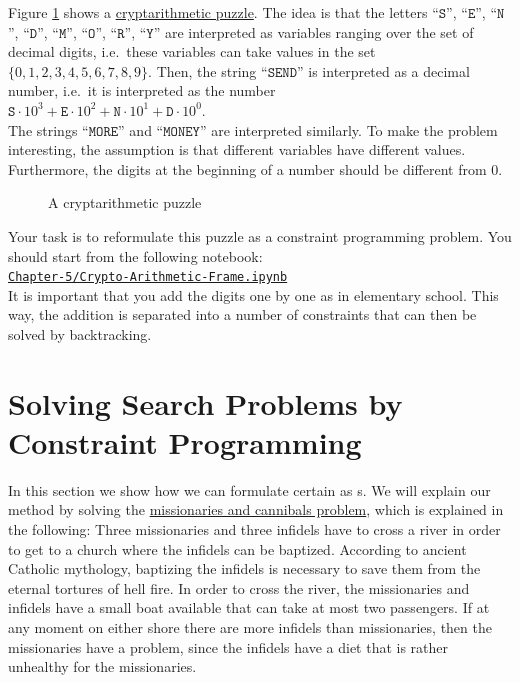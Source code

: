 \exerciseEng
Figure \ref{fig:send-more-money.pdf} shows a
\href{https://en.wikipedia.org/wiki/Verbal_arithmetic}{cryptarithmetic puzzle}.
The idea is that the letters 
``$\texttt{S}$'', ``$\texttt{E}$'', ``$\texttt{N}$'', ``$\texttt{D}$'', ``$\texttt{M}$'', ``$\texttt{O}$'', ``$\texttt{R}$'', ``$\texttt{Y}$'' 
are interpreted as variables ranging over the set of decimal digits, i.e.~these variables can take values in
the set $\{0,1,2,3,4,5,6,7,8,9\}$.  Then, the string ``$\texttt{SEND}$'' is interpreted as a decimal number,
i.e.~it is interpreted as the number
\\[0.2cm]
\hspace*{1.3cm}
$\texttt{S} \cdot 10^3 + \texttt{E} \cdot 10^2 + \texttt{N} \cdot 10^1 + \texttt{D} \cdot 10^0$.
\\[0.2cm]
The strings ``$\texttt{MORE}$'' and ``$\texttt{MONEY}$'' are interpreted similarly. To make the problem
interesting, the assumption is that different variables have different values.  Furthermore, the
digits at the beginning of a number should be different from $0$.


\begin{figure}[!ht]
\centering
{}

\caption{A cryptarithmetic puzzle}
\label{fig:send-more-money.pdf}
\end{figure}

Your task is to reformulate this puzzle as a constraint
programming problem.  You should start from the following notebook:
\\[0.2cm]
\hspace*{1.3cm}
\href{https://github.com/karlstroetmann/Logic/blob/master/TypeScript/Chapter-5/Crypto-Arithmetic-Frame.ipynb}{\texttt{Chapter-5/Crypto-Arithmetic-Frame.ipynb}}
\\[0.2cm]
It is important that you add the digits one by one as in elementary school.  This way, the addition is
separated into a number of constraints that can then be solved by backtracking.  \eox

\section{Solving Search Problems by Constraint Programming}
In this section we show how we can formulate certain  as s.
We will explain our method by solving the
\href{https://flashmuseum.org/priests-n-devils/}{missionaries and cannibals problem},
which is explained in the following:
Three missionaries and three infidels have to cross a river in order to get to a church where the infidels can
be baptized.  According to ancient Catholic mythology, baptizing the infidels is necessary to save them from
the eternal tortures of hell fire. In order to cross the river, the missionaries and infidels have a small boat
available that can take at most two passengers. If at any moment on either shore there are more infidels than
missionaries, then the missionaries have a problem, since the infidels have a diet that is rather unhealthy for
the missionaries. 

